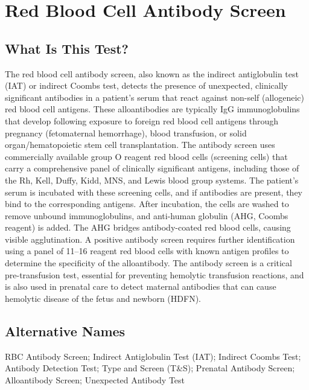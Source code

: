 \chapter{Red Blood Cell Antibody Screen}

\section*{What Is This Test?}
The red blood cell antibody screen, also known as the indirect antiglobulin test (IAT) or indirect Coombs test, detects the presence of unexpected, clinically significant antibodies in a patient's serum that react against non-self (allogeneic) red blood cell antigens. These alloantibodies are typically IgG immunoglobulins that develop following exposure to foreign red blood cell antigens through pregnancy (fetomaternal hemorrhage), blood transfusion, or solid organ/hematopoietic stem cell transplantation. The antibody screen uses commercially available group O reagent red blood cells (screening cells) that carry a comprehensive panel of clinically significant antigens, including those of the Rh, Kell, Duffy, Kidd, MNS, and Lewis blood group systems. The patient's serum is incubated with these screening cells, and if antibodies are present, they bind to the corresponding antigens. After incubation, the cells are washed to remove unbound immunoglobulins, and anti-human globulin (AHG, Coombs reagent) is added. The AHG bridges antibody-coated red blood cells, causing visible agglutination. A positive antibody screen requires further identification using a panel of 11--16 reagent red blood cells with known antigen profiles to determine the specificity of the alloantibody. The antibody screen is a critical pre-transfusion test, essential for preventing hemolytic transfusion reactions, and is also used in prenatal care to detect maternal antibodies that can cause hemolytic disease of the fetus and newborn (HDFN).

\section*{Alternative Names}
RBC Antibody Screen; Indirect Antiglobulin Test (IAT); Indirect Coombs Test; Antibody Detection Test; Type and Screen (T\&S); Prenatal Antibody Screen; Alloantibody Screen; Unexpected Antibody Test

